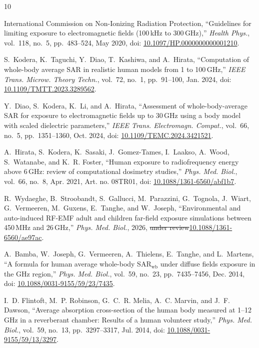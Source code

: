 \documentclass[journal,twocolumn,10pt]{IEEEtran}
\newcommand*{\doi}[1]{\href{https://doi.org/#1}{#1}}
\providecommand{\DIFaddtex}[1]{{\protect\color{blue}\uwave{#1}}} %
\providecommand{\DIFdeltex}[1]{{\protect\color{red}\sout{#1}}}                      %
\providecommand{\DIFaddbegin}{} %
\providecommand{\DIFaddend}{} %
\providecommand{\DIFdelbegin}{} %
\providecommand{\DIFdelend}{} %
\providecommand{\DIFadd}[1]{\texorpdfstring{\DIFaddtex{#1}}{#1}} %
\providecommand{\DIFdel}[1]{\texorpdfstring{\DIFdeltex{#1}}{}} %
\newcommand{\DIFscaledelfig}{0.5}
\newlength{\DIFdelgraphicswidth} %
\newlength{\DIFdelgraphicsheight} %
\newcommand{\DIFaddincludegraphics}[2][]{{\color{blue}\fbox{\DIFOincludegraphics[#1]{#2}}}} %
\newcommand{\DIFdelincludegraphics}[2][]{%
\sbox{\DIFdelgraphicsbox}{\DIFOincludegraphics[#1]{#2}}%
\settoboxwidth{\DIFdelgraphicswidth}{\DIFdelgraphicsbox} %
\settoboxtotalheight{\DIFdelgraphicsheight}{\DIFdelgraphicsbox} %
\scalebox{\DIFscaledelfig}{%
\parbox[b]{\DIFdelgraphicswidth}{\usebox{\DIFdelgraphicsbox}\\[-\baselineskip] \rule{\DIFdelgraphicswidth}{0em}}\llap{\resizebox{\DIFdelgraphicswidth}{\DIFdelgraphicsheight}{%
\setlength{\unitlength}{\DIFdelgraphicswidth}%
\begin{picture}(1,1)%
\thicklines\linethickness{2pt} %
{\color[rgb]{1,0,0}\put(0,0){\framebox(1,1){}}}%
{\color[rgb]{1,0,0}\put(0,0){\line( 1,1){1}}}%
{\color[rgb]{1,0,0}\put(0,1){\line(1,-1){1}}}%
\end{picture}%
}\hspace*{3pt}}} %
} %
\DeclareRobustCommand{\DIFaddbegin}{\DIFOaddbegin \let\includegraphics\DIFaddincludegraphics} %
\DeclareRobustCommand{\DIFaddend}{\DIFOaddend \let\includegraphics\DIFOincludegraphics} %
\DeclareRobustCommand{\DIFdelbegin}{\DIFOdelbegin \let\includegraphics\DIFdelincludegraphics} %
\DeclareRobustCommand{\DIFdelend}{\DIFOaddend \let\includegraphics\DIFOincludegraphics} %
\begin{document}
\begin{thebibliography}{10}
\providecommand{\url}[1]{#1}

International Commission on Non-Ionizing Radiation Protection,
  ``Guidelines for limiting exposure to electromagnetic fields
  (100\,kHz to 300\,GHz),'' \emph{Health Phys.}, vol.~118, no.~5,
  pp.~483--524, May 2020, doi: \doi{10.1097/HP.0000000000001210}.

S.~Kodera, K.~Taguchi, Y.~Diao, T.~Kashiwa, and A.~Hirata,
  ``Computation of whole-body average SAR in realistic human models from
  1 to 100\,GHz,'' \emph{IEEE Trans. Microw. Theory Techn.}, vol.~72,
  no.~1, pp.~91--100, Jan. 2024, doi: \doi{10.1109/TMTT.2023.3289562}.

Y.~Diao, S.~Kodera, K.~Li, and A.~Hirata, ``Assessment of
  whole-body-average SAR for exposure to electromagnetic fields up to
  30\,GHz using a body model with scaled dielectric parameters,''
  \emph{IEEE Trans. Electromagn. Compat.}, vol.~66, no.~5,
  pp.~1351--1360, Oct. 2024, doi: \doi{10.1109/TEMC.2024.3421521}.

A.~Hirata, S.~Kodera, K.~Sasaki, J.~Gomez-Tames, I.~Laakso, A.~Wood,
  S.~Watanabe, and K.~R. Foster, ``Human exposure to radiofrequency
  energy above 6\,GHz: review of computational dosimetry studies,''
  \emph{Phys. Med. Biol.}, vol.~66, no.~8, Apr. 2021, Art. no. 08TR01,
  doi: \doi{10.1088/1361-6560/abf1b7}.

R.~Wydaeghe, B.~Stroobandt, S.~Gallucci, M.~Parazzini, G.~Tognola,
  J.~Wiart, G.~Vermeeren, M.~Guxens, E.~Tanghe, and W.~Joseph,
  ``Environmental and auto-induced RF-EMF adult and children far-field
  exposure simulations between 450\,MHz and 26\,GHz,''
  \emph{Phys. Med. Biol.}, \DIFaddbegin \DIFadd{accepted for publication, }\DIFaddend 2026,
  \DIFdelbegin \DIFdel{under review}\DIFdelend \DIFaddbegin \DIFadd{doi: }\doi{10.1088/1361-6560/ae97ac}\DIFaddend .

A.~Bamba, W.~Joseph, G.~Vermeeren, A.~Thielens, E.~Tanghe, and L.~Martens,
  ``A formula for human average whole-body SAR$_{\mathrm{wb}}$ under diffuse
  fields exposure in the GHz region,'' \emph{Phys. Med. Biol.}, vol.~59,
  no.~23, pp.~7435--7456, Dec. 2014, doi: \doi{10.1088/0031-9155/59/23/7435}.

I.~D. Flintoft, M.~P. Robinson, G.~C.~R. Melia, A.~C. Marvin, and
  J.~F. Dawson, ``Average absorption cross-section of the human body
  measured at 1--12\,GHz in a reverberant chamber: Results of a human
  volunteer study,'' \emph{Phys. Med. Biol.}, vol.~59, no.~13,
  pp.~3297--3317, Jul. 2014, doi: \doi{10.1088/0031-9155/59/13/3297}.


\end{thebibliography}
\end{document}

